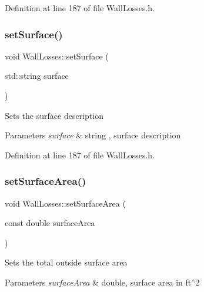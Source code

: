 Definition at line 187 of file Wall\+Losses.\+h.

\mbox{\label{class_wall_losses_af329a27b78e1f2d84af6a48ffc59bfad}} 
\subsubsection{\texorpdfstring{set\+Surface()}{setSurface()}\hspace{0.1cm}{\footnotesize\ttfamily [3/3]}}
{\footnotesize\ttfamily void Wall\+Losses\+::set\+Surface (\begin{DoxyParamCaption}\item[{std\+::string}]{surface }\end{DoxyParamCaption})\hspace{0.3cm}{\ttfamily [inline]}}

Sets the surface description 
\begin{DoxyParams}{Parameters}
{\em surface} & string , surface description \\
\hline
\end{DoxyParams}


Definition at line 187 of file Wall\+Losses.\+h.

\mbox{\label{class_wall_losses_acbbbe4b1ec44bb04e5e1db944017995c}} 
\subsubsection{\texorpdfstring{set\+Surface\+Area()}{setSurfaceArea()}\hspace{0.1cm}{\footnotesize\ttfamily [1/3]}}
{\footnotesize\ttfamily void Wall\+Losses\+::set\+Surface\+Area (\begin{DoxyParamCaption}\item[{const double}]{surface\+Area }\end{DoxyParamCaption})\hspace{0.3cm}{\ttfamily [inline]}}

Sets the total outside surface area 
\begin{DoxyParams}{Parameters}
{\em surface\+Area} & double, surface area in ft$^\wedge$2 \\
\hline
\end{DoxyParams}



